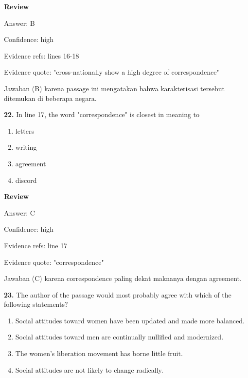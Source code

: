 \documentclass[12pt]{article}
\begin{document}
\setlength{\parskip}{0pt}
\setlength{\parindent}{0pt}
\textbf{Review}\par
Answer: B\par
Confidence: high\par
Evidence refs: lines 16-18\par
Evidence quote: "cross-nationally show a high degree of correspondence"\par
Jawaban (B) karena passage ini mengatakan bahwa karakterisasi tersebut ditemukan di beberapa negara.\par
\endgroup
\par
\vspace{0.25\baselineskip}
\noindent\textbf{22.} In line 17, the word "correspondence" is closest in meaning to
\begin{enumerate}[label=(\Alph*),leftmargin=*,itemsep=0.2em]
\item letters
\item writing
\item agreement
\item discord
\end{enumerate}
\par
\begingroup
\setlength{\parskip}{0pt}
\setlength{\parindent}{0pt}
\textbf{Review}\par
Answer: C\par
Confidence: high\par
Evidence refs: line 17\par
Evidence quote: "correspondence"\par
Jawaban (C) karena correspondence paling dekat maknanya dengan agreement.\par
\endgroup
\par
\vspace{0.25\baselineskip}
\noindent\textbf{23.} The author of the passage would most probably agree with which of the following statements?
\begin{enumerate}[label=(\Alph*),leftmargin=*,itemsep=0.2em]
\item Social attitudes toward women have been updated and made more balanced.
\item Social attitudes toward men are continually nullified and modernized.
\item The women's liberation movement has borne little fruit.
\item Social attitudes are not likely to change radically.
\end{enumerate}
\par
\begingroup
\setlength{\parskip}{0pt}
\end{document}
